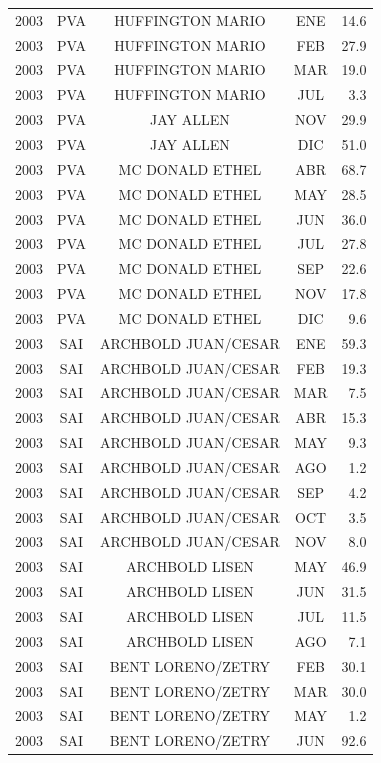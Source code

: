\documentclass[12pt,]{article}
\begin{document}
\begin{table}[ht]
{\begin{tabular}{lcccr}
  2003 & PVA & HUFFINGTON MARIO & ENE & 14.6 \\ 
  2003 & PVA & HUFFINGTON MARIO & FEB & 27.9 \\ 
  2003 & PVA & HUFFINGTON MARIO & MAR & 19.0 \\ 
  2003 & PVA & HUFFINGTON MARIO & JUL & 3.3 \\ 
  2003 & PVA & JAY ALLEN & NOV & 29.9 \\ 
  2003 & PVA & JAY ALLEN & DIC & 51.0 \\ 
  2003 & PVA & MC DONALD ETHEL & ABR & 68.7 \\ 
  2003 & PVA & MC DONALD ETHEL & MAY & 28.5 \\ 
  2003 & PVA & MC DONALD ETHEL & JUN & 36.0 \\ 
  2003 & PVA & MC DONALD ETHEL & JUL & 27.8 \\ 
  2003 & PVA & MC DONALD ETHEL & SEP & 22.6 \\ 
  2003 & PVA & MC DONALD ETHEL & NOV & 17.8 \\ 
  2003 & PVA & MC DONALD ETHEL & DIC & 9.6 \\ 
  2003 & SAI & ARCHBOLD JUAN/CESAR & ENE & 59.3 \\ 
  2003 & SAI & ARCHBOLD JUAN/CESAR & FEB & 19.3 \\ 
  2003 & SAI & ARCHBOLD JUAN/CESAR & MAR & 7.5 \\ 
  2003 & SAI & ARCHBOLD JUAN/CESAR & ABR & 15.3 \\ 
  2003 & SAI & ARCHBOLD JUAN/CESAR & MAY & 9.3 \\ 
  2003 & SAI & ARCHBOLD JUAN/CESAR & AGO & 1.2 \\ 
  2003 & SAI & ARCHBOLD JUAN/CESAR & SEP & 4.2 \\ 
  2003 & SAI & ARCHBOLD JUAN/CESAR & OCT & 3.5 \\ 
  2003 & SAI & ARCHBOLD JUAN/CESAR & NOV & 8.0 \\ 
  2003 & SAI & ARCHBOLD LISEN & MAY & 46.9 \\ 
  2003 & SAI & ARCHBOLD LISEN & JUN & 31.5 \\ 
  2003 & SAI & ARCHBOLD LISEN & JUL & 11.5 \\ 
  2003 & SAI & ARCHBOLD LISEN & AGO & 7.1 \\ 
  2003 & SAI & BENT LORENO/ZETRY & FEB & 30.1 \\ 
  2003 & SAI & BENT LORENO/ZETRY & MAR & 30.0 \\ 
  2003 & SAI & BENT LORENO/ZETRY & MAY & 1.2 \\ 
  2003 & SAI & BENT LORENO/ZETRY & JUN & 92.6 \\ 

\end{tabular}}
\end{table}
\end{document}
